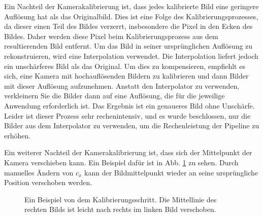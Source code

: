 \documentclass[arbeit=studie,oneside,BCOR=12mm]{ArbeitRST}
\begin{document}
Ein Nachteil der Kamerakalibrierung ist, dass jedes kalibrierte Bild eine
geringere Auflösung hat als das Originalbild. Dies ist eine Folge des
Kalibrierungsprozesses, da dieser einen Teil des Bildes verzerrt,
insbesondere die Pixel in den Ecken des Bildes. Daher werden diese Pixel beim
Kalibrierungsprozess aus dem resultierenden Bild entfernt. Um das Bild in
seiner ursprünglichen Auflösung zu rekonstruieren, wird eine Interpolation
verwendet. Die Interpolation liefert jedoch ein unschärferes Bild als das
Original. Um dies zu kompensieren, empfiehlt es sich, eine Kamera mit
hochauflösenden Bildern zu kalibrieren und dann Bilder mit dieser Auflösung
aufzunehmen. Anstatt den Interpolator zu verwenden, verkleinern Sie die Bilder
dann auf eine Auflösung, die für die jeweilige Anwendung erforderlich ist.  Das
Ergebnis ist ein genaueres Bild ohne Unschärfe. Leider ist dieser Prozess sehr
rechenintensiv, und es wurde beschlossen, nur die Bilder aus dem Interpolator
zu verwenden, um die Rechenleistung der Pipeline zu erhöhen.

Ein weiterer Nachteil der Kamerakalibrierung ist, dass sich der Mittelpunkt der
Kamera verschieben kann. Ein Beispiel dafür ist in Abb. \ref{shifted} zu sehen. Durch
manuelles Ändern von $c_x$ kann der Bildmittelpunkt wieder an seine
ursprüngliche Position verschoben werden. 

\begin{figure}[h]
    \centering
    \caption{Ein Beispiel von dem Kalibrierungsschritt. Die Mittellinie des
    rechten Bilds ist leicht nach rechts im linken Bild verschoben.}
    \label{shifted}
\end{figure}
\end{document}

